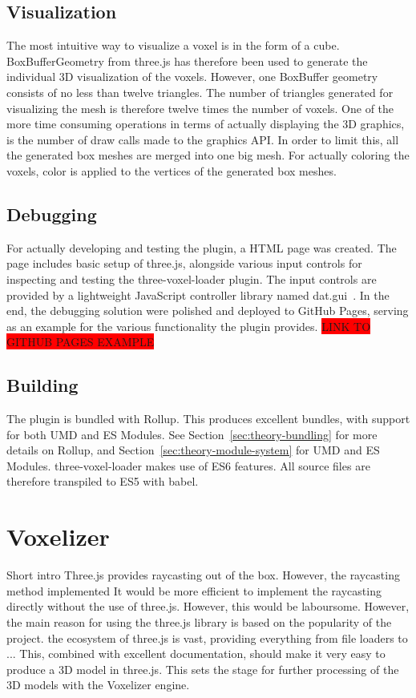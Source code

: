 \subsection{Visualization}
The most intuitive way to visualize a voxel is in the form of a cube. BoxBufferGeometry from three.js has therefore been used to generate the individual 3D visualization of the voxels. However, one BoxBuffer geometry consists of no less than twelve triangles. The number of triangles generated for visualizing the mesh is therefore twelve times the number of voxels. One of the more time consuming operations in terms of actually displaying the 3D graphics, is the number of draw calls made to the graphics API. In order to limit this, all the generated box meshes are merged into one big mesh. For actually coloring the voxels, color is applied to the vertices of the generated box meshes.

\subsection{Debugging}
For actually developing and testing the plugin, a HTML page was created. The page includes basic setup of three.js, alongside various input controls for inspecting and testing the three-voxel-loader plugin. The input controls are provided by a lightweight JavaScript controller library named dat.gui~\cite{dat.gui}. In the end, the debugging solution were polished and deployed to GitHub Pages, serving as an example for the various functionality the plugin provides. \colorbox{red}{LINK TO GITHUB PAGES EXAMPLE}

\subsection{Building}
The plugin is bundled with Rollup. This produces excellent bundles, with support for both UMD and ES Modules. See Section~\ref{sec:theory-bundling} for more details on Rollup, and Section~\ref{sec:theory-module-system} for UMD and ES Modules. three-voxel-loader makes use of ES6 features. All source files are therefore transpiled to ES5 with babel.

\section{Voxelizer}
Short intro
Three.js provides raycasting out  of the box. However, the raycasting method implemented It would be more efficient to implement the raycasting directly without the use of three.js. However, this would be laboursome. However, the main reason for using the three.js library is based on the popularity of the project. the ecosystem of three.js is vast, providing everything from file loaders to ... This, combined with excellent documentation, should make it very easy to produce a 3D model in three.js. This sets the stage for further processing of the 3D models with the Voxelizer engine.

